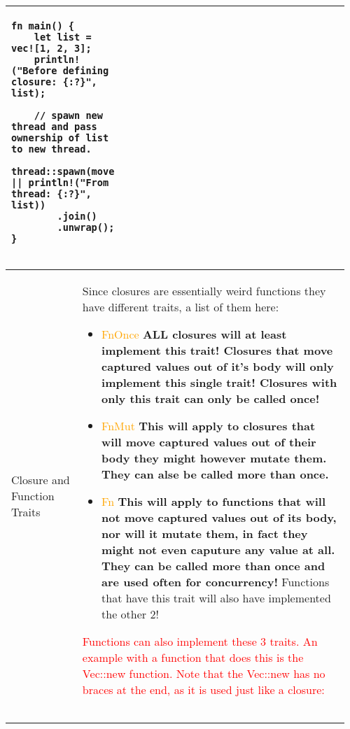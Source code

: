 \documentclass[main.tex,fontsize=8pt,paper=a4,paper=portrait,DIV=calc,]{scrartcl}
\begin{document}
\begin{table}[ht!]
\begin{tabular}{|m{0.2\linewidth}|m{0.755\linewidth}|}
\begin{lstlisting}
fn main() {
    let list = vec![1, 2, 3];
    println!("Before defining closure: {:?}", list);

    // spawn new thread and pass ownership of list to new thread.
    thread::spawn(move || println!("From thread: {:?}", list))
        .join()
        .unwrap();
}
\end{lstlisting}\\
\hline
\end{tabular}
\end{table}
\pagebreak
\begin{table}[ht!]
\begin{tabular}{|m{0.2\linewidth}|m{0.755\linewidth}|}
\hline
Closure and Function Traits & 
Since closures are essentially weird functions they have different traits, a list of them here: \newline
\begin{itemize}
\item \textcolor{orange}{FnOnce}\newline
  \textbf{ALL closures will at least implement this trait! \newline
  Closures that move captured values out of it's body will only implement this single trait!\newline
  Closures with only this trait can only be called once!}
\item \textcolor{orange}{FnMut}\newline
  \textbf{This will apply to closures that will move captured values out of their body\newline
  they might however mutate them. They can alse be called more than once.}
\item \textcolor{orange}{Fn}\newline
  \textbf{This will apply to functions that will not move captured values out of its body, nor will it mutate them,\newline
  in fact they might not even caputure any value at all. They can be called more than once and are used often for concurrency!}\newline
  Functions that have this trait will also have implemented the other 2!
\end{itemize} 
\textcolor{red}{Functions can also implement these 3 traits. An example with a function that does this is the Vec::new function.\newline
Note that the Vec::new has no braces at the end, as it is used just like a closure:}\newline
\begin{lstlisting}

\end{lstlisting}
\end{tabular}
\end{table}
\end{document}
